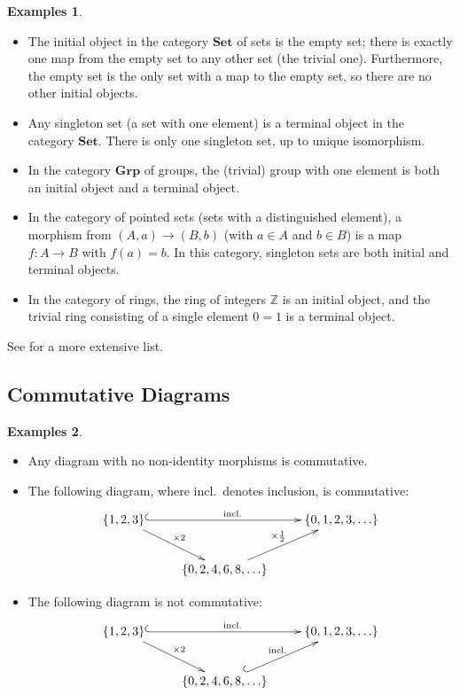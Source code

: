 \documentclass{amsart}
\theoremstyle{definition} \newaliasedtheorem{defn}[thm]{Definition}
\theoremstyle{definition} \newtheorem*{defn*}{Definition}
\theoremstyle{definition} \newaliasedtheorem{xca}[thm]{Exercise}
\theoremstyle{definition} \newtheorem*{soln*}{Solution}
\theoremstyle{definition} \newaliasedtheorem{remark}[thm]{Remark}
\theoremstyle{definition} \newtheorem*{remark*}{Remark}
\newtheorem*{examples*}{Examples}
\newcommand{\cat}[1]{\ensuremath{\mathbf{#1}}}
\begin{document}
    \begin{examples*}\par\noindent
      \begin{itemize}
        \item The initial object in the category \cat{Set} of sets is the empty set; there is exactly one map from the empty set to any other set (the trivial one).  Furthermore, the empty set is the only set with a map to the empty set, so there are no other initial objects.
        \item Any singleton set (a set with one element) is a terminal object in the category \cat{Set}.  There is only one singleton set, up to unique isomorphism.
        \item In the category \cat{Grp} of groups, the (trivial) group with one element is both an initial object and a terminal object.
        \item In the category of pointed sets (sets with a distinguished element), a morphism from $(A, a) \to (B, b)$ (with $a\in A$ and $b\in B$) is a map $f : A \to B$ with $f(a) = b$.  In this category, singleton sets are both initial and terminal objects.
        \item In the category of rings, the ring of integers $\mathbb Z$ is an initial object, and the trivial ring consisting of a single element $0 = 1$ is a terminal object.
      \end{itemize}
      See \cite{wiki:InitialAndTerminalObjects} for a more extensive list.
    \end{examples*}
    
  \subsection{Commutative Diagrams} \label{sec:commutative-diagrams}
    \begin{examples*}\par\noindent
      \begin{itemize}
        \item Any diagram with no non-identity morphisms is commutative.
        \item The following diagram, where incl.~denotes inclusion, is commutative:
          \[
            \xymatrix{
              \{1, 2, 3\} \ar@{^(->}[rr]^{\text{incl.}} \ar[dr]^{\times 2} && \{0, 1, 2, 3, \ldots\} \\
              & \{0, 2, 4, 6, 8, \ldots\} \ar[ur]^{\times \frac12}
            }
          \]
        \item The following diagram is not commutative:
          \[
            \xymatrix{
              \{1, 2, 3\} \ar@{^(->}[rr]^{\text{incl.}} \ar[dr]^{\times 2} && \{0, 1, 2, 3, \ldots\} \\
              & \{0, 2, 4, 6, 8, \ldots\} \ar@{^(->}[ur]^{\text{incl.}}
            }
          \]
      \end{itemize}
    \end{examples*}
    
\end{document}
